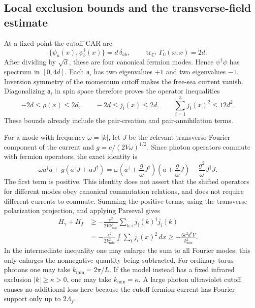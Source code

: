 \subsection{Local exclusion bounds and the transverse-field estimate}
\label{app-finite:photon}

At a fixed point the cutoff CAR are
\[
 \{\psi_a(x),\psi_b^\dagger(x)\}=d\,\delta_{ab},
 \qquad \operatorname{tr}_{\mathbb C^4}\Gamma_0(x,x)=2d.
\]
After dividing by $\sqrt d$, these are four canonical fermion modes.  Hence
$\psi^\dagger\psi$ has spectrum in $[0,4d]$.  Each $\mathsf a_i$ has two
eigenvalues $+1$ and two eigenvalues $-1$.  Inversion symmetry of the momentum
cutoff makes the free-sea current vanish.  Diagonalizing $\mathsf a_i$ in
spin space therefore proves the operator inequalities
\begin{equation}
 -2d\le\rho(x)\le2d,\qquad
 -2d\le j_i(x)\le2d,\qquad
 \sum_{i=1}^3j_i(x)^2\le12d^2.
 \label{app-finite:local-car}
\end{equation}
These bounds already include the pair-creation and pair-annihilation terms.

For a mode with frequency $\omega=|k|$, let $J$ be the relevant transverse
Fourier component of the current and $g=e/(2V\omega)^{1/2}$.  Since photon
operators commute with fermion operators, the exact identity is
\begin{equation}
 \omega a^\dagger a+g(a^\dagger J+aJ^\dagger)
 =\omega\left(a^\dagger+\frac g\omega J^\dagger\right)
             \left(a+\frac g\omega J\right)
       -\frac{g^2}{\omega}J^\dagger J.
 \label{app-finite:square}
\end{equation}
The first term is positive.  This identity does not assert that the shifted
operators for different modes obey canonical commutation relations, and does
not require different currents to commute.  Summing the positive terms,
using the transverse polarization projection, and applying Parseval gives
\begin{align}
 H_\gamma+H_I
 &\ge-\frac{e^2}{2V k_{\min}^2}
       \sum_{k,i}j_i(k)^\dagger j_i(k)\\
 &=-\frac{e^2}{2 k_{\min}^2}
       \int\sum_i j_i(x)^2\,dx
 \ge-\frac{6e^2d^2V}{k_{\min}^2}.
 \label{app-finite:photon-bound}
\end{align}
In the intermediate inequality one may enlarge the sum to all Fourier modes;
this only enlarges the nonnegative quantity being subtracted.  For ordinary
torus photons one may take $k_{\min}=2\pi/L$.  If the model instead has a fixed
infrared exclusion $|k|\ge\kappa>0$, one may take $k_{\min}=\kappa$.  A large
photon ultraviolet cutoff causes no additional loss here because the cutoff
fermion current has Fourier support only up to $2\Lambda_f$.

